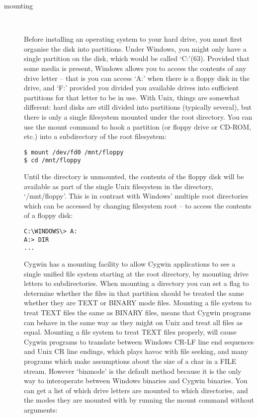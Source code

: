 \begin{description}
\item [mounting]
\

    Before installing an operating system to your hard drive, you must first organise the disk into partitions. Under Windows, you might only have a single partition on the disk, which would be called `C:'(63). Provided that some media is present, Windows allows you to access the contents of any drive letter -- that is you can access `A:' when there is a floppy disk in the drive, and `F:' provided you divided you available drives into sufficient partitions for that letter to be in use. With Unix, things are somewhat different: hard disks are still divided into partitions (typically several), but there is only a single filesystem mounted under the root directory. You can use the mount command to hook a partition (or floppy drive or CD-ROM, etc.) into a subdirectory of the root filesystem:

\begin{Verbatim}[frame=single]
$ mount /dev/fd0 /mnt/floppy
$ cd /mnt/floppy
\end{Verbatim}

Until the directory is unmounted, the contents of the floppy disk will be available as part of the single Unix filesystem in the directory, `/mnt/floppy'. This is in contrast with Windows' multiple root directories which can be accessed by changing filesystem root -- to access the contents of a floppy disk:

\begin{Verbatim}[frame=single]
C:\WINDOWS\> A:
A:> DIR
...
\end{Verbatim}

Cygwin has a mounting facility to allow Cygwin applications to see a single unified file system starting at the root directory, by mounting drive letters to subdirectories. When mounting a directory you can set a flag to determine whether the files in that partition should be treated the same whether they are TEXT or BINARY mode files. Mounting a file system to treat TEXT files the same as BINARY files, means that Cygwin programs can behave in the same way as they might on Unix and treat all files as equal. Mounting a file system to treat TEXT files properly, will cause Cygwin programs to translate between Windows CR-LF line end sequences and Unix CR line endings, which plays havoc with file seeking, and many programs which make assumptions about the size of a char in a FILE stream. However `binmode' is the default method because it is the only way to interoperate between Windows binaries and Cygwin binaries. You can get a list of which drive letters are mounted to which directories, and the modes they are mounted with by running the mount command without arguments:


\end{description}
